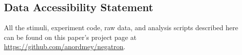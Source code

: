 \documentclass[man, floatsintext, noapacite]{apa6}
\begin{document}
\subsection{Data Accessibility Statement} 
All the stimuli, experiment code, raw data, and analysis scripts described here can be found on this paper's project page at \url{https://github.com/anordmey/negatron}. 






\end{document}
